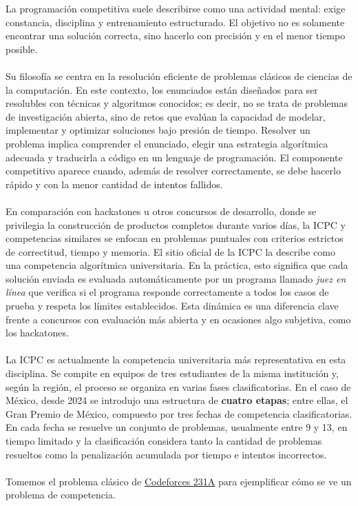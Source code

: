 La programación competitiva suele describirse como una actividad mental: exige constancia, disciplina y entrenamiento estructurado. El objetivo no es solamente encontrar una solución correcta, sino hacerlo con precisión y en el menor tiempo posible.
\\\\
Su filosofía se centra en la resolución eficiente de problemas clásicos de ciencias de la computación. En este contexto, los enunciados están diseñados para ser resolubles con técnicas y algoritmos conocidos; es decir, no se trata de problemas de investigación abierta, sino de retos que evalúan la capacidad de modelar, implementar y optimizar soluciones bajo presión de tiempo. Resolver un problema implica comprender el enunciado, elegir una estrategia algorítmica adecuada y traducirla a código en un lenguaje de programación. El componente competitivo aparece cuando, además de resolver correctamente, se debe hacerlo rápido y con la menor cantidad de intentos fallidos.
\\\\
En comparación con hackatones u otros concursos de desarrollo, donde se privilegia la construcción de productos completos durante varios días, la ICPC y competencias similares se enfocan en problemas puntuales con criterios estrictos de correctitud, tiempo y memoria. El sitio oficial de la ICPC la describe como una competencia algorítmica universitaria. En la práctica, esto significa que cada solución enviada es evaluada automáticamente por un programa llamado \textit{juez en línea} que verifica si el programa responde correctamente a todos los casos de prueba y respeta los límites establecidos. Esta dinámica es una diferencia clave frente a concursos con evaluación más abierta y en ocasiones algo subjetiva, como los hackatones.
\\\\
La ICPC es actualmente la competencia universitaria más representativa en esta disciplina. Se compite en equipos de tres estudiantes de la misma institución y, según la región, el proceso se organiza en varias fases clasificatorias. En el caso de México, desde 2024 se introdujo una estructura de \textbf{cuatro etapas}; entre ellas, el Gran Premio de México, compuesto por tres fechas de competencia clasificatorias. En cada fecha se resuelve un conjunto de problemas, usualmente entre 9 y 13, en tiempo limitado y la clasificación considera tanto la cantidad de problemas resueltos como la penalización acumulada por tiempo e intentos incorrectos.
\\\\
Tomemos el problema clásico de \href{https://codeforces.com/problemset/problem/231/A}{Codeforces 231A} para ejemplificar cómo se ve un problema de competencia.

